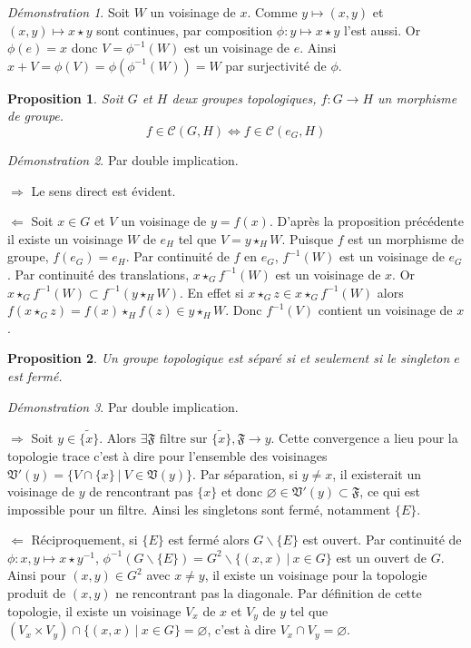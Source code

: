 \documentclass[a4paper, 11pt, french]{book}
\newenvironment{itemise}{\itemize}{\enditemize}
\theoremstyle{plain} %
\newtheorem{proposition}{Proposition}
\theoremstyle{definition} %
\theoremstyle{remark} %
\newtheorem*{demonstration}{Démonstration}
\renewcommand{\setminus}{\backslash}
\newcommand{\1}{\mathds{1}}
\newcommand\vide{\varnothing}
\newcommand{\inv}[1]{#1^{-1}}
\renewcommand{\cal}[1]{\mathcal{#1}}
\renewcommand{\frak}[1]{\mathfrak{#1}}
\newcommand\ens[2]{\{#1 \ |\ #2\}}
\newcommand\equivalence[3]{
	\begin{demonstration}
		#1
		\begin{itemise}
			\item[$\Longrightarrow$] #2
			\item[$\Longleftarrow$] #3
		\end{itemise}
	\end{demonstration}
}
\begin{document}
\begin{demonstration}
	Soit $W$ un voisinage de $x$.
	Comme $y\longmapsto(x, y)$ et $(x, y)\longmapsto x\star y$ sont continues, par composition $\phi:y\longmapsto x\star y$ l'est aussi.
	Or $\phi(e)=x$ donc $V=\inv{\phi}(W)$ est un voisinage de $e$.
	Ainsi $x+V=\phi(V)=\phi(\inv{\phi}(W))=W$ par surjectivité de $\phi$.
\end{demonstration}

\begin{proposition}
	Soit $G$ et $H$ deux groupes topologiques, $f:G\rightarrow H$ un morphisme de groupe.
	$$
		f\in\cal{C}(G, H)\iff f\in\cal{C}(e_G, H)
	$$
\end{proposition}

\equivalence{Par double implication.}{
	Le sens direct est évident.
}{
	Soit $x\in G$ et $V$ un voisinage de $y=f(x)$.
	D'après la proposition précédente il existe un voisinage $W$ de $e_H$ tel que $V=y\star_HW$.
	Puisque $f$ est un morphisme de groupe, $f(e_G)=e_H$.
	Par continuité de $f$ en $e_G$, $\inv{f}(W)$ est un voisinage de $e_G$.
	Par continuité des translations, $x\star_G\inv{f}(W)$ est un voisinage de $x$.
	Or $x\star_G\inv{f}(W)\subset\inv{f}(y\star_HW)$.
	En effet si $x\star_Gz\in x\star_G\inv{f}(W)$ alors $f(x\star_Gz)=f(x)\star_Hf(z)\in y\star_HW$.
	Donc $\inv{f}(V)$ contient un voisinage de $x$.
}

\begin{proposition}
	Un groupe topologique est séparé si et seulement si le singleton ${e}$ est fermé.
\end{proposition}

\equivalence{Par double implication.}{
	Soit $y\in\widetilde{\{x\}}$.
	Alors $\exists\frak{F}\text{ filtre sur $\widetilde{\{x\}}$}, \frak{F}\rightarrow y$.
	Cette convergence a lieu pour la topologie trace c'est à dire pour l'ensemble des voisinages $\frak{V}'(y)=\{V\cap\ens{x\}}{V\in\frak{V}(y)}$.
	Par séparation, si $y\neq x$, il existerait un voisinage de $y$ de rencontrant pas $\{x\}$ et donc $\vide\in\frak{V}'(y)\subset\frak{F}$, ce qui est impossible pour un filtre.
	Ainsi les singletons sont fermé, notamment $\{E\}$.
}{
	Réciproquement, si $\{E\}$ est fermé alors $G\setminus\{E\}$ est ouvert.
	Par continuité de $\phi:x, y\longmapsto x\star\inv{y}$, $\inv{\phi}(G\setminus\{E\})=G^2\setminus\ens{(x, x)}{x\in G}$ est un ouvert de $G$.
	Ainsi pour $(x, y)\in G^2$ avec $x\neq y$, il existe un voisinage pour la topologie produit de $(x, y)$ ne rencontrant pas la diagonale.
	Par définition de cette topologie, il existe un voisinage $V_x$ de $x$ et $V_y$ de $y$ tel que $(V_x\times V_y)\cap\ens{(x, x)}{x\in G}=\vide$, c'est à dire $V_x\cap V_y=\vide$.
}
\end{document}
